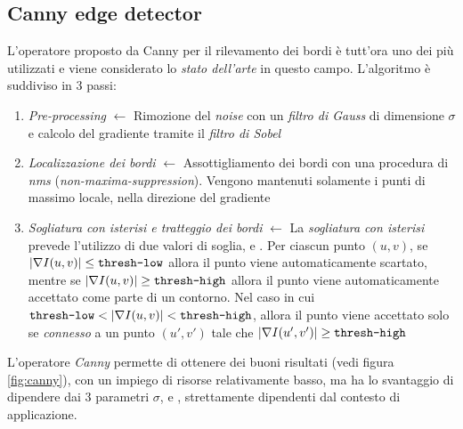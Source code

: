 \subsection{Canny edge detector}
\label{subsec:canny}
L'operatore proposto da Canny \cite{bib:canny} per il rilevamento dei bordi \`e tutt'ora uno dei pi\`u utilizzati e viene considerato lo \textit{stato dell'arte} in questo campo. L'algoritmo \`e suddiviso in 3 passi:
\begin{enumerate}
	\item \textit{Pre-processing} $\gets$ Rimozione del \textit{noise} con un \textit{filtro di Gauss} di dimensione $\sigma$ e calcolo del gradiente tramite il \textit{filtro di Sobel}
	\item \textit{Localizzazione dei bordi} $\gets$ Assottigliamento dei bordi con una procedura di \textit{nms} (\textit{non-maxima-suppression}). Vengono mantenuti solamente i punti di massimo locale, nella direzione del gradiente
	\item \textit{Sogliatura con isterisi e tratteggio dei bordi} $\gets$ La \textit{sogliatura con isterisi} prevede l'utilizzo di due valori di soglia,  e . Per ciascun punto $(u, v)$, se $|\nabla I(u, v)| \leq \texttt{thresh-low}$ allora il punto viene automaticamente scartato, mentre se $|\nabla I(u, v)| \geq \texttt{thresh-high}$ allora il punto viene automaticamente accettato come parte di un contorno. Nel caso in cui $\texttt{thresh-low} < |\nabla I(u, v)| < \texttt{thresh-high}$, allora il punto viene accettato solo se \textit{connesso} a un punto $(u', v')$ tale che $|\nabla I(u', v')| \geq \texttt{thresh-high}$
\end{enumerate}\par
L'operatore \textit{Canny} permette di ottenere dei buoni risultati (vedi figura \ref{fig:canny}), con un impiego di risorse relativamente basso, ma ha lo svantaggio di dipendere dai 3 parametri $\sigma$,  e , strettamente dipendenti dal contesto di applicazione.
